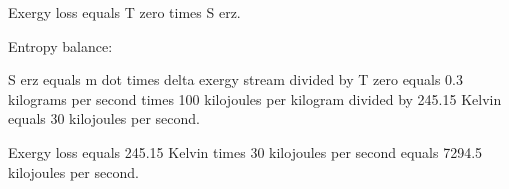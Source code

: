 Exergy loss equals T zero times S erz.  

Entropy balance:  

S erz equals m dot times delta exergy stream divided by T zero equals 0.3 kilograms per second times 100 kilojoules per kilogram divided by 245.15 Kelvin equals 30 kilojoules per second.  

Exergy loss equals 245.15 Kelvin times 30 kilojoules per second equals 7294.5 kilojoules per second.
